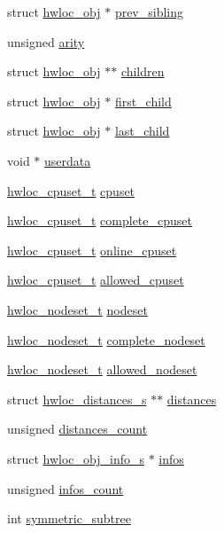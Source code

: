 \begin{DoxyCompactItemize}
\item 
struct \hyperlink{a00016}{hwloc\_\-obj} $\ast$ \hyperlink{a00016_a7b89e8c189876c0158a9282aaaf17f50}{prev\_\-sibling}
\item 
unsigned \hyperlink{a00016_aac3f6da35c9b57599909a44ce2b716c1}{arity}
\item 
struct \hyperlink{a00016}{hwloc\_\-obj} $\ast$$\ast$ \hyperlink{a00016_a04d05403da37bfe17cd63b7c7dd07b1f}{children}
\item 
struct \hyperlink{a00016}{hwloc\_\-obj} $\ast$ \hyperlink{a00016_af51d08a0a79dba517c06c5afedc8d2dc}{first\_\-child}
\item 
struct \hyperlink{a00016}{hwloc\_\-obj} $\ast$ \hyperlink{a00016_a84bd65634dbc55f4158b74443a9bd04f}{last\_\-child}
\item 
void $\ast$ \hyperlink{a00016_a76fd3ac94401cf32dfccc3a3a8de68a5}{userdata}
\item 
\hyperlink{a00040_ga4bbf39b68b6f568fb92739e7c0ea7801}{hwloc\_\-cpuset\_\-t} \hyperlink{a00016_a67925e0f2c47f50408fbdb9bddd0790f}{cpuset}
\item 
\hyperlink{a00040_ga4bbf39b68b6f568fb92739e7c0ea7801}{hwloc\_\-cpuset\_\-t} \hyperlink{a00016_a91788a9da687beb7224cc1fd7b75208c}{complete\_\-cpuset}
\item 
\hyperlink{a00040_ga4bbf39b68b6f568fb92739e7c0ea7801}{hwloc\_\-cpuset\_\-t} \hyperlink{a00016_a8842d56c2975380f327ea401c5f53564}{online\_\-cpuset}
\item 
\hyperlink{a00040_ga4bbf39b68b6f568fb92739e7c0ea7801}{hwloc\_\-cpuset\_\-t} \hyperlink{a00016_afa3c59a6dd3da8ffa48710780a1bfb34}{allowed\_\-cpuset}
\item 
\hyperlink{a00040_ga37e35730fa7e775b5bb0afe893d6d508}{hwloc\_\-nodeset\_\-t} \hyperlink{a00016_a08f0d0e16c619a6e653526cbee4ffea3}{nodeset}
\item 
\hyperlink{a00040_ga37e35730fa7e775b5bb0afe893d6d508}{hwloc\_\-nodeset\_\-t} \hyperlink{a00016_ac38c4012127525ef74c5615c526f4c2e}{complete\_\-nodeset}
\item 
\hyperlink{a00040_ga37e35730fa7e775b5bb0afe893d6d508}{hwloc\_\-nodeset\_\-t} \hyperlink{a00016_a19e3d0a5951a7510fc4fc4722a9bf531}{allowed\_\-nodeset}
\item 
struct \hyperlink{a00014}{hwloc\_\-distances\_\-s} $\ast$$\ast$ \hyperlink{a00016_a9a5dd75596edc48fe834f81988cdc0d6}{distances}
\item 
unsigned \hyperlink{a00016_a8be6f63eca4da91000c832280db927b7}{distances\_\-count}
\item 
struct \hyperlink{a00018}{hwloc\_\-obj\_\-info\_\-s} $\ast$ \hyperlink{a00016_ad59bcd73a10260a0e239be5c4b5888bb}{infos}
\item 
unsigned \hyperlink{a00016_a9843acc28cfbba903b63ea14b137ff70}{infos\_\-count}
\item 
int \hyperlink{a00016_a0f41a1d67dc6b661906f2217563637f3}{symmetric\_\-subtree}
\end{DoxyCompactItemize}


